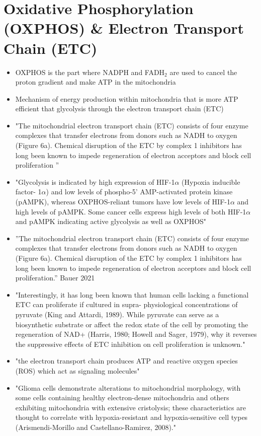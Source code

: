\documentclass[11pt,a4paper]{article}
\begin{document}
\section{Oxidative Phosphorylation (OXPHOS) \& Electron Transport Chain (ETC)}
\begin{itemize}
\item OXPHOS is the part where NADPH and FADH$_2$ are used to cancel the proton gradient and make ATP in the mitochondria \cite{Berg2006}
\item Mechanism of energy production within mitochondria that is more ATP efficient that glycolysis through the electron transport chain (ETC) \cite{Berg2006}
\item "The mitochondrial electron transport chain (ETC) consists of four enzyme complexes that transfer electrons from donors such as NADH to oxygen (Figure 6a). Chemical disruption of the ETC by complex 1 inhibitors has long been known to impede regeneration of electron acceptors and block cell proliferation ”
\item "Glycolysis is indicated by high expression of HIF-1$\alpha$ (Hypoxia inducible factor-
1$\alpha$) and low levels of phospho-5’ AMP-activated protein kinase (pAMPK), whereas
OXPHOS-reliant tumors have low levels of HIF-1$\alpha$ and high levels of pAMPK. Some
cancer cells express high levels of both HIF-1$\alpha$ and pAMPK indicating active glycolysis
as well as OXPHOS" \cite{Nayak2018}
\item ”The mitochondrial electron transport chain (ETC) consists of four enzyme complexes that transfer electrons from donors such as NADH to oxygen (Figure 6a). Chemical disruption of the ETC by complex 1 inhibitors has long been known to impede regeneration of electron acceptors and block cell proliferation.” Bauer 2021
\item "Interestingly, it has long been known that human cells lacking a functional ETC can proliferate if cultured in supra-
physiological concentrations of pyruvate (King and Attardi, 1989). While pyruvate can serve as a biosynthetic substrate or affect the redox state of the cell by promoting the
regeneration of NAD+ (Harris, 1980; Howell and Sager, 1979), why it reverses the suppressive effects of ETC inhibition on cell proliferation is unknown."\cite{Birsoy2015}
\item "the electron transport chain produces ATP and reactive oxygen species (ROS) which act as signaling molecules"\cite{Strickland2017}
\item "Glioma cells demonstrate alterations to mitochondrial morphology, with some cells containing healthy electron-dense mitochondria and others exhibiting mitochondria with extensive cristolysis; these characteristics are thought to correlate with hypoxia-resistant and hypoxia-sensitive cell types (Arismendi-Morillo and Castellano-Ramirez, 2008)."

\end{itemize}
\end{document}
